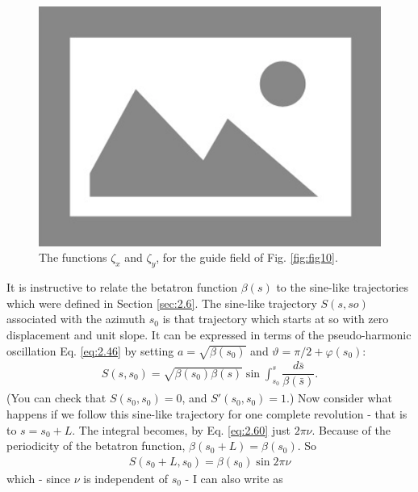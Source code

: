 \begin{figure}[!htb]
	\centering
	\includegraphics[width=0.8\linewidth]{./Figuras/placeholder.png}
	\caption{The functions $\zeta_x$ and $\zeta_y$, for the guide field of Fig. \ref{fig:fig10}.}
	\label{fig:fig18}
\end{figure}

It is instructive to relate the betatron function $\beta(s)$ to the sine-like trajectories which were defined in Section \ref{sec:2.6}. The sine-like trajectory $S(s, so)$ associated with the azimuth $s_0$ is that trajectory which starts at so with zero displacement
and unit slope. It can be expressed in terms of the pseudo-harmonic oscillation Eq. \eqref{eq:2.46} by setting $a = \sqrt{\beta(s_0)}$ and $\vartheta = \pi/2+\varphi(s_0)$:
\begin{align}
	S(s,s_0) = \sqrt{\beta(s_0)\beta(s)}\sin\int_{s_0}^s\dfrac{d\bar{s}}{\beta(\bar{s})}.
\end{align}
(You can check that $S(s_0, s_0) = 0$, and $S'(s_0, s_0) = 1$.) Now consider what happens if we follow this sine-like trajectory for one complete revolution - that is to $s = s_0 + L$. The integral becomes, by Eq. \eqref{eq:2.60} just $2\pi\nu$. Because of the periodicity of the betatron function, $\beta(s_0 + L) = \beta(s_0)$. So
\begin{align}
	S(s_0+L,s_0)=\beta(s_0)\sin2\pi\nu
\end{align}
which - since $\nu$ is independent of $s_0$ - I can also write as

